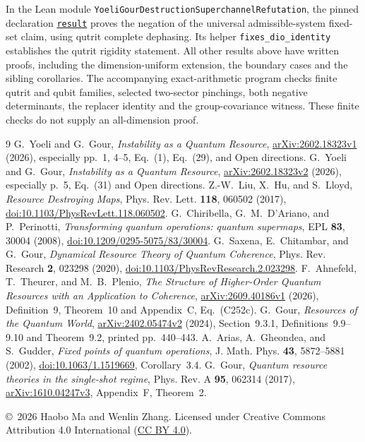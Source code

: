 \documentclass[11pt]{article}
\begin{document}
In the Lean module \texttt{YoeliGourDestructionSuperchannelRefutation},
the pinned declaration
\href{https://github.com/the-omega-institute/trureturing/blob/a252cc46f0e145418a978217b8abd41a73fd820d/D5/S3/QuantumChannels/YoeliGourDestructionSuperchannelRefutation.lean}{\texttt{result}}
proves the negation of the universal admissible-system fixed-set claim,
using qutrit complete dephasing. Its helper
\texttt{fixes\_dio\_identity} establishes the qutrit rigidity statement.
All other results above have written proofs, including the dimension-uniform
extension, the boundary cases and the sibling corollaries. The accompanying
exact-arithmetic program checks finite qutrit and qubit families, selected
two-sector pinchings, both negative determinants, the replacer identity and
the group-covariance witness. These finite checks do not supply an
all-dimension proof.

\begin{thebibliography}{9}
 G.~Yoeli and G.~Gour,
\emph{Instability as a Quantum Resource},
\href{https://arxiv.org/abs/2602.18323v1}{arXiv:2602.18323v1} (2026),
especially pp.~1, 4--5, Eq.~(1), Eq.~(29), and Open directions.
 G.~Yoeli and G.~Gour,
\emph{Instability as a Quantum Resource},
\href{https://arxiv.org/abs/2602.18323v2}{arXiv:2602.18323v2} (2026),
especially p.~5, Eq.~(31) and Open directions.
 Z.-W.~Liu, X.~Hu, and S.~Lloyd,
\emph{Resource Destroying Maps}, Phys. Rev. Lett. \textbf{118}, 060502 (2017),
\href{https://doi.org/10.1103/PhysRevLett.118.060502}{doi:10.1103/PhysRevLett.118.060502}.
 G.~Chiribella, G.~M.~D'Ariano, and P.~Perinotti,
\emph{Transforming quantum operations: quantum supermaps},
EPL \textbf{83}, 30004 (2008),
\href{https://doi.org/10.1209/0295-5075/83/30004}{doi:10.1209/0295-5075/83/30004}.
 G.~Saxena, E.~Chitambar, and G.~Gour,
\emph{Dynamical Resource Theory of Quantum Coherence},
Phys. Rev. Research \textbf{2}, 023298 (2020),
\href{https://doi.org/10.1103/PhysRevResearch.2.023298}{doi:10.1103/PhysRevResearch.2.023298}.
 F.~Ahnefeld, T.~Theurer, and M.~B.~Plenio,
\emph{The Structure of Higher-Order Quantum Resources with an Application
to Coherence},
\href{https://arxiv.org/abs/2609.40186v1}{arXiv:2609.40186v1} (2026),
Definition~9, Theorem~10 and Appendix~C, Eq.~(C252c).
 G.~Gour, \emph{Resources of the Quantum World},
\href{https://arxiv.org/abs/2402.05474v2}{arXiv:2402.05474v2} (2024),
Section~9.3.1, Definitions~9.9--9.10 and Theorem~9.2,
printed pp.~440--443.
 A.~Arias, A.~Gheondea, and S.~Gudder,
\emph{Fixed points of quantum operations},
J. Math. Phys. \textbf{43}, 5872--5881 (2002),
\href{https://doi.org/10.1063/1.1519669}{doi:10.1063/1.1519669},
Corollary~3.4.
 G.~Gour,
\emph{Quantum resource theories in the single-shot regime},
Phys. Rev. A \textbf{95}, 062314 (2017),
\href{https://arxiv.org/abs/1610.04247v3}{arXiv:1610.04247v3},
Appendix~F, Theorem~2.
\end{thebibliography}
\bigskip\noindent\small
\copyright\ 2026 Haobo Ma and Wenlin Zhang.
Licensed under Creative Commons Attribution 4.0 International
(\href{https://creativecommons.org/licenses/by/4.0/}{CC BY 4.0}).
\end{document}
